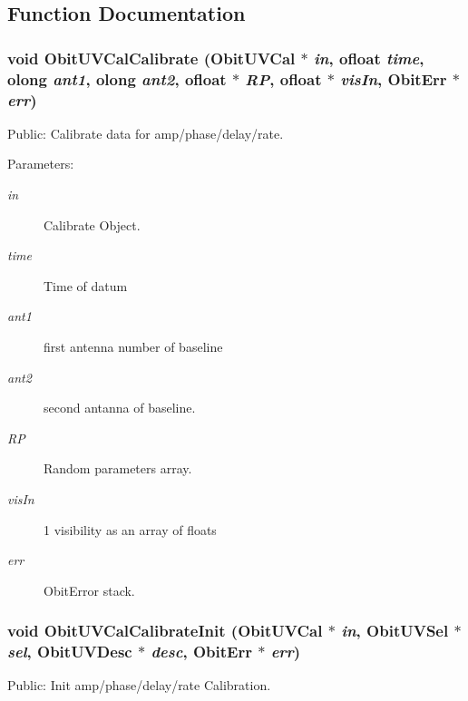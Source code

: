 \subsection{Function Documentation}
\subsubsection{\setlength{\rightskip}{0pt plus 5cm}void Obit\-UVCal\-Calibrate ({\bf Obit\-UVCal} $\ast$ {\em in}, {\bf ofloat} {\em time}, {\bf olong} {\em ant1}, {\bf olong} {\em ant2}, {\bf ofloat} $\ast$ {\em RP}, {\bf ofloat} $\ast$ {\em vis\-In}, {\bf Obit\-Err} $\ast$ {\em err})}\label{ObitUVCalCalibrate_8h_a1}


Public: Calibrate data for amp/phase/delay/rate. 

\begin{Desc}
\item[Parameters:]
\begin{description}
\item[{\em in}]Calibrate Object. \item[{\em time}]Time of datum \item[{\em ant1}]first antenna number of baseline \item[{\em ant2}]second antanna of baseline. \item[{\em RP}]Random parameters array. \item[{\em vis\-In}]1 visibility as an array of floats \item[{\em err}]Obit\-Error stack. \end{description}
\end{Desc}
\subsubsection{\setlength{\rightskip}{0pt plus 5cm}void Obit\-UVCal\-Calibrate\-Init ({\bf Obit\-UVCal} $\ast$ {\em in}, {\bf Obit\-UVSel} $\ast$ {\em sel}, {\bf Obit\-UVDesc} $\ast$ {\em desc}, {\bf Obit\-Err} $\ast$ {\em err})}\label{ObitUVCalCalibrate_8h_a0}


Public: Init amp/phase/delay/rate Calibration. 

